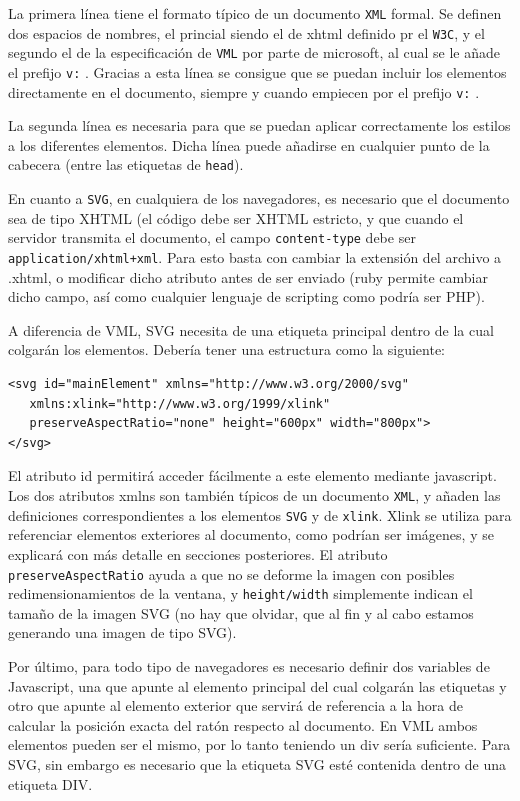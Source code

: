 La primera línea tiene el formato típico de un documento \texttt{XML} formal. Se definen dos espacios de nombres, el princial siendo el de xhtml definido pr el \texttt{W3C}, y el segundo el de la especificación de \texttt{VML} por parte de microsoft, al cual se le añade el prefijo \texttt{v:} . Gracias a esta línea se consigue que se puedan incluir los elementos directamente en el documento, siempre y cuando empiecen por el prefijo \texttt{v:} .

La segunda línea es necesaria para que se puedan aplicar correctamente los estilos a los diferentes elementos. Dicha línea puede añadirse en cualquier punto de la cabecera (entre las etiquetas de \texttt{head}).

En cuanto a \texttt{SVG}, en cualquiera de los navegadores, es necesario que el documento sea de tipo XHTML (el código debe ser XHTML estricto, y que cuando el servidor transmita el documento, el campo \texttt{content-type} debe ser \texttt{application/xhtml+xml}. Para esto basta con cambiar la extensión del archivo a .xhtml, o modificar dicho atributo antes de ser enviado (ruby permite cambiar dicho campo, así como cualquier lenguaje de scripting como podría ser PHP). 

A diferencia de VML, SVG necesita de una etiqueta principal dentro de la cual colgarán los elementos. Debería tener una estructura como la siguiente:

\begin{verbatim}
<svg id="mainElement" xmlns="http://www.w3.org/2000/svg" 
   xmlns:xlink="http://www.w3.org/1999/xlink" 
   preserveAspectRatio="none" height="600px" width="800px">
</svg>
\end{verbatim}

El atributo id permitirá acceder fácilmente a este elemento mediante javascript. Los dos atributos xmlns son también típicos de un documento \texttt{XML}, y añaden las definiciones correspondientes a los elementos \texttt{SVG} y de \texttt{xlink}. Xlink se utiliza para referenciar elementos exteriores al documento, como podrían ser imágenes, y se explicará con más detalle en secciones posteriores. El atributo \texttt{preserveAspectRatio} ayuda a que no se deforme la imagen con posibles redimensionamientos de la ventana, y \texttt{height/width} simplemente indican el tamaño de la imagen SVG (no hay que olvidar, que al fin y al cabo estamos generando una imagen de tipo SVG).

Por último, para todo tipo de navegadores es necesario definir dos variables de Javascript, una que apunte al elemento principal del cual colgarán las etiquetas y otro que apunte al elemento exterior que servirá de referencia a la hora de calcular la posición exacta del ratón respecto al documento. En VML ambos elementos pueden ser el mismo, por lo tanto teniendo un div sería suficiente. Para SVG, sin embargo es necesario que la etiqueta SVG esté contenida dentro de una etiqueta DIV.

